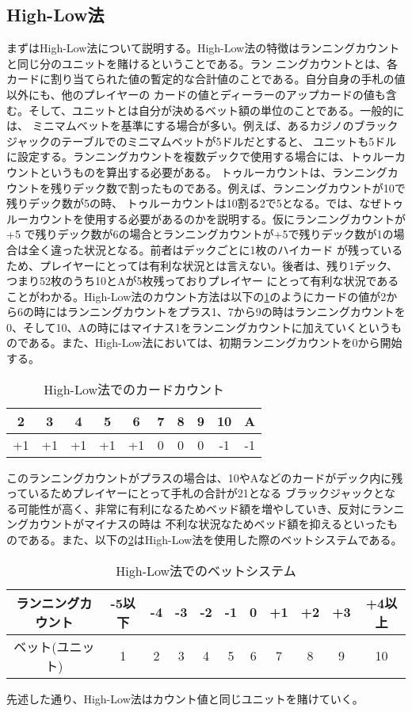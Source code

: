 \subsection{High-Low法}
まずはHigh-Low法について説明する。High-Low法の特徴はランニングカウントと同じ分のユニットを賭けるということである。ラン
ニングカウントとは、各カードに割り当てられた値の暫定的な合計値のことである。自分自身の手札の値以外にも、他のプレイヤーの
カードの値とディーラーのアップカードの値も含む。そして、ユニットとは自分が決めるベット額の単位のことである。一般的には、
ミニマムベットを基準にする場合が多い。例えば、あるカジノのブラックジャックのテーブルでのミニマムベットが5ドルだとすると、
ユニットも5ドルに設定する。ランニングカウントを複数デックで使用する場合には、トゥルーカウントというものを算出する必要がある。
トゥルーカウントは、ランニングカウントを残りデック数で割ったものである。例えば、ランニングカウントが10で残りデック数が5の時、
トゥルーカウントは10割る2で5となる。では、なぜトゥルーカウントを使用する必要があるのかを説明する。仮にランニングカウントが+5
で残りデック数が6の場合とランニングカウントが+5で残りデック数が1の場合は全く違った状況となる。前者はデックごとに1枚のハイカード
が残っているため、プレイヤーにとっては有利な状況とは言えない。後者は、残り1デック、つまり52枚のうち10とAが5枚残っておりプレイヤー
にとって有利な状況であることがわかる。High-Low法のカウント方法は以下の\ref{hlc}のようにカードの値が2から6の時にはランニングカウントをプラス1、7から9の時はランニングカウントを0、そして10、Aの時にはマイナス1をランニングカウントに加えていくというものである。また、High-Low法においては、初期ランニングカウントを0から開始する。
  \begin{table}[H]
    \centering
    \label{hlc}
    \caption{High-Low法でのカードカウント}
    \begin{tabular}{|c|c|c|c|c|c|c|c|c|c|} \hline
      2&3&4&5&6&7&8&9&10&A \\ \hline
      +1&+1&+1&+1&+1&0&0&0&-1&-1 \\ \hline
    \end{tabular}
  \end{table}
このランニングカウントがプラスの場合は、10やAなどのカードがデック内に残っているためプレイヤーにとって手札の合計が21となる
ブラックジャックとなる可能性が高く、非常に有利になるためベッド額を増やしていき、反対にランニングカウントがマイナスの時は
不利な状況なためベッド額を抑えるといったものである。また、以下の\ref{hlb}はHigh-Low法を使用した際のベットシステムである。
  \begin{table}[H]
    \centering
    \label{hlb}
    \caption{High-Low法でのベットシステム}
    \begin{tabular}{|c|c|c|c|c|c|c|c|c|c|c|} \hline
      ランニングカウント&-5以下&-4&-3&-2&-1&0&+1&+2&+3&+4以上 \\ \hline
      ベット(ユニット)&1&2&3&4&5&6&7&8&9&10 \\ \hline
    \end{tabular}
  \end{table}
先述した通り、High-Low法はカウント値と同じユニットを賭けていく。

